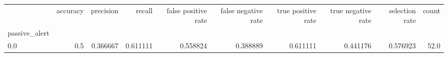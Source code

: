 \begin{tabular}{lrrrrrrrrr}
\toprule
{} &  accuracy &  precision &    recall &  false positive rate &  false negative rate &  true positive rate &  true negative rate &  selection rate &  count \\
passive\_alert &           &            &           &                      &                      &                     &                     &                 &        \\
\midrule
0.0           &       0.5 &   0.366667 &  0.611111 &             0.558824 &             0.388889 &            0.611111 &            0.441176 &        0.576923 &   52.0 \\
\bottomrule
\end{tabular}
